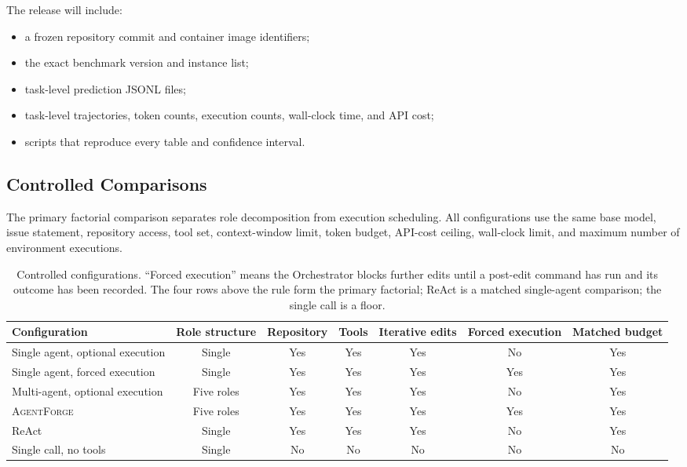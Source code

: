 \documentclass[journal]{IEEEtran}
\newcommand{\agentforge}{\textsc{AgentForge}}
\begin{document}
The release will include:
\begin{itemize}
    \item a frozen repository commit and container image identifiers;
    \item the exact benchmark version and instance list;
    \item task-level prediction JSONL files;
    \item task-level trajectories, token counts, execution counts, wall-clock time, and API cost;
    \item scripts that reproduce every table and confidence interval.
\end{itemize}

\subsection{Controlled Comparisons}

The primary factorial comparison separates role decomposition from execution scheduling. All configurations use the same base model, issue statement, repository access, tool set, context-window limit, token budget, API-cost ceiling, wall-clock limit, and maximum number of environment executions.

\begin{table}[t]
\centering
\caption{Controlled configurations. ``Forced execution'' means the Orchestrator blocks further edits until a post-edit command has run and its outcome has been recorded. The four rows above the rule form the primary factorial; ReAct is a matched single-agent comparison; the single call is a floor.}
\label{tab:configs}
\begin{tabular}{lcccccc}
\toprule
Configuration & Role structure & Repository & Tools & Iterative edits & Forced execution & Matched budget \\
\midrule
Single agent, optional execution & Single & Yes & Yes & Yes & No & Yes \\
Single agent, forced execution & Single & Yes & Yes & Yes & Yes & Yes \\
Multi-agent, optional execution & Five roles & Yes & Yes & Yes & No & Yes \\
\agentforge{} & Five roles & Yes & Yes & Yes & Yes & Yes \\
\midrule
ReAct & Single & Yes & Yes & Yes & No & Yes \\
Single call, no tools & Single & No & No & No & No & No \\
\bottomrule
\end{tabular}
\end{table}
\end{document}
